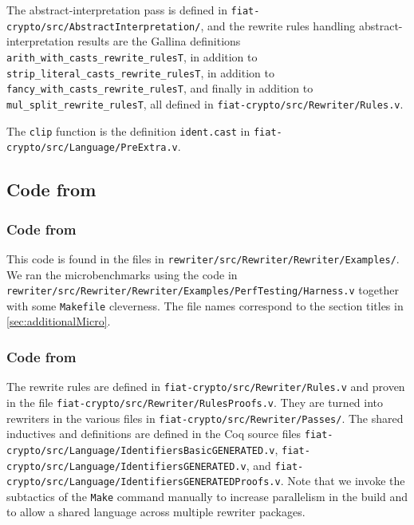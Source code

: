 \begin{subappendices}
The abstract-interpretation pass is defined in \texttt{fiat-crypto/src/AbstractInterpretation/}, and the rewrite rules handling abstract-interpretation results are the Gallina definitions \verb|arith_with_casts_rewrite_rulesT|, in addition to \verb|strip_literal_casts_rewrite_rulesT|, in addition to \verb|fancy_with_casts_rewrite_rulesT|, and finally in addition to \verb|mul_split_rewrite_rulesT|, all defined in \texttt{fiat-crypto/src/Rewriter/Rules.v}.

The \verb|clip| function is the definition \verb|ident.cast| in \texttt{fiat-crypto/src/Language/PreExtra.v}.

\subsection{Code from }

\subsubsection{Code from }

This code is found in the files in \texttt{rewriter/src/Rewriter/Rewriter/Examples/}.
We ran the microbenchmarks using the code in \texttt{rewriter/src/Rewriter/Rewriter/Examples/PerfTesting/Harness.v} together with some \texttt{Makefile} cleverness.
The file names correspond to the section titles in \autoref{sec:additionalMicro}.

\subsubsection{Code from }

The rewrite rules are defined in \texttt{fiat-crypto/src/Rewriter/Rules.v} and proven in the file \texttt{fiat-crypto/src/Rewriter/RulesProofs.v}.
They are turned into rewriters in the various files in \texttt{fiat-crypto/src/Rewriter/Passes/}.
The shared inductives and definitions are defined in the Coq source files \texttt{fiat-crypto/src/Language/IdentifiersBasicGENERATED.v}, \texttt{fiat-crypto/src/Language/IdentifiersGENERATED.v}, and \texttt{fiat-crypto/src/Language/IdentifiersGENERATEDProofs.v}.
Note that we invoke the subtactics of the \texttt{Make} command manually to increase parallelism in the build and to allow a shared language across multiple rewriter packages.
\end{subappendices}
